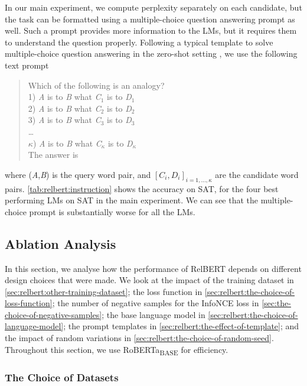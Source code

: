 \documentclass[3p]{elsarticle}
\begin{document}
{In our main experiment, we compute perplexity separately on each candidate, but the task can be formatted using a multiple-choice question answering prompt as well. Such a prompt provides more information to the LMs, but it requires them to understand the question properly. Following a typical template to solve multiple-choice question answering in the zero-shot setting \cite{GPT3,https://doi.org/10.48550/arxiv.2210.11416}, we use the following text prompt 
\begin{quote}
Which of the following is an analogy? \\
1) \textit{A} is to \textit{B} what \textit{C}$_1$ is to \textit{D}$_1$ \\
2) \textit{A} is to \textit{B} what \textit{C}$_2$ is to \textit{D}$_2$ \\
3) \textit{A} is to \textit{B} what \textit{C}$_3$ is to \textit{D}$_3$ \\
\dots \\
$\kappa$) \textit{A} is to \textit{B} what \textit{C}$_{\kappa}$ is to \textit{D}$_{\kappa}$ \\
The answer is
\end{quote}
where (\textit{A},\textit{B}) is the query word pair, and $[C_i, D_i]_{i=1,\dots,\kappa}$ are the candidate word pairs. 
\autoref{tab:relbert:instruction} shows the accuracy on SAT, for the four best performing LMs on SAT in the main experiment. We can see that the multiple-choice prompt is substantially worse for all the LMs.



\subsection{Ablation Analysis}\label{sec:relbert:ablation-abalysis}
In this section, we analyse how the performance of RelBERT depends on different design choices that were made. We look at the impact of the training dataset in \autoref{sec:relbert:other-training-dataset}; the loss function in \autoref{sec:relbert:the-choice-of-loss-function}; the number of negative samples for the InfoNCE loss in \autoref{sec:the-choice-of-negative-samples}; the base language model in \autoref{sec:relbert:the-choice-of-language-model}; the prompt templates in \autoref{sec:relbert:the-effect-of-template}; and the impact of random variations in \autoref{sec:relbert:the-choice-of-random-seed}. Throughout this section, we use RoBERTa\textsubscript{BASE} for efficiency.


\subsubsection{The Choice of Datasets}
\label{sec:relbert:other-training-dataset}



}
\end{document}
